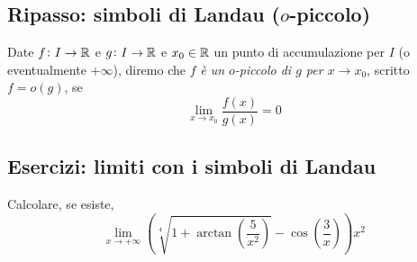 \subsection{Ripasso: simboli di Landau (\texorpdfstring{$o$}{o}-piccolo)}
\begin{definition}
    \label{def:5.4}
    Date $f\colon I \to \amsbb{R}$ e $g\colon I \to \amsbb{R}$ e $x_0\in\amsbb{R}$ un punto di accumulazione per $I$ (o eventualmente $+\infty$), diremo che $f$ \emph{è un $o$-piccolo di $g$ per $x\to x_0$}, scritto $f=o(g)$, se
    \[
    \lim_{x\to x_0} \frac{f(x)}{g(x)} = 0
    \]
\end{definition}
\subsection{Esercizi: limiti con i simboli di Landau}
\begin{exercise}
    \label{ex:5.4}
    Calcolare, se esiste,
    \[
    \lim_{x\to +\infty} \left(\sqrt[4]{1+   \arctan\left(\frac{5}{x^2}\right)}-\cos\left(\frac{3}{x}\right)\right)x^2
    \]
\end{exercise}
